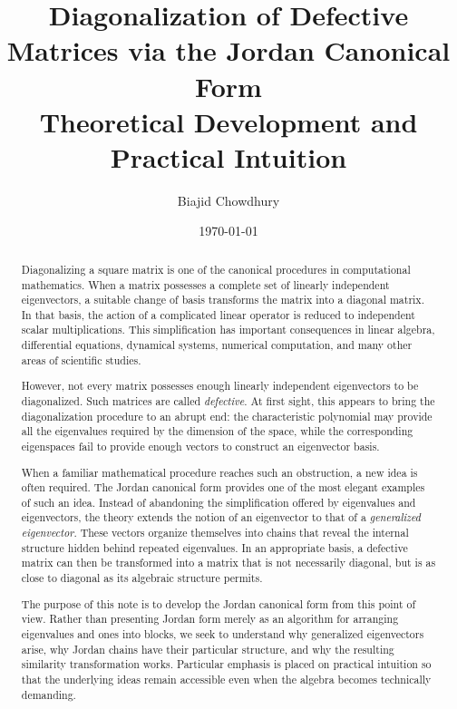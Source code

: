 \documentclass[11pt]{article}
\title{
\textbf{Diagonalization of Defective Matrices via the Jordan Canonical Form}\\[0.3cm]
\large Theoretical Development and Practical Intuition
}
\author{Biajid Chowdhury}
\date{\today}
\begin{document}
\maketitle


\begin{abstract}

Diagonalizing a square matrix is one of the canonical procedures in
computational mathematics.  When a matrix possesses a complete set of
linearly independent eigenvectors, a suitable change of basis transforms
the matrix into a diagonal matrix.  In that basis, the action of a
complicated linear operator is reduced to independent scalar
multiplications.  This simplification has important consequences in
linear algebra, differential equations, dynamical systems, numerical
computation, and many other areas of scientific studies.

However, not every matrix possesses enough linearly independent
eigenvectors to be diagonalized.  Such matrices are called
\emph{defective}.  At first sight, this appears to bring the
diagonalization procedure to an abrupt end: the characteristic
polynomial may provide all the eigenvalues required by the dimension of
the space, while the corresponding eigenspaces fail to provide enough
vectors to construct an eigenvector basis.

When a familiar mathematical procedure reaches such an obstruction,
a new idea is often required.  The Jordan canonical form provides one
of the most elegant examples of such an idea.  Instead of abandoning
the simplification offered by eigenvalues and eigenvectors, the theory
extends the notion of an eigenvector to that of a
\emph{generalized eigenvector}.  These vectors organize themselves into
chains that reveal the internal structure hidden behind repeated
eigenvalues.  In an appropriate basis, a defective matrix can then be
transformed into a matrix that is not necessarily diagonal, but is as
close to diagonal as its algebraic structure permits.

The purpose of this note is to develop the Jordan canonical form from
this point of view.  Rather than presenting Jordan form merely as an
algorithm for arranging eigenvalues and ones into blocks, we seek to
understand why generalized eigenvectors arise, why Jordan chains have
their particular structure, and why the resulting similarity
transformation works.  Particular emphasis is placed on practical
intuition so that the underlying ideas remain accessible even when the
algebra becomes technically demanding.

\end{abstract}
\end{document}
